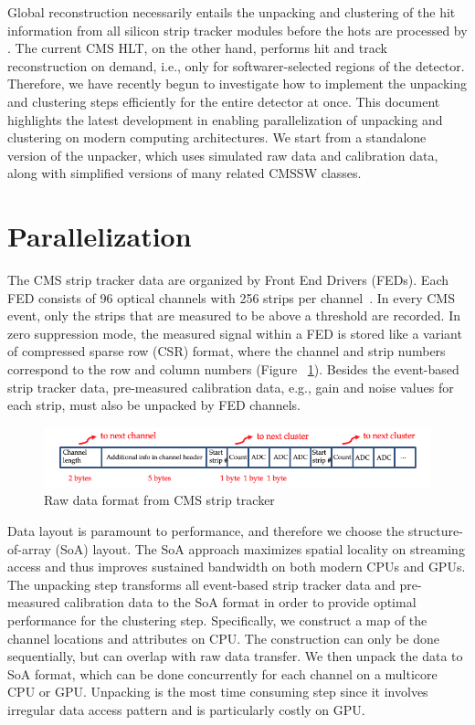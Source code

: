\documentclass[10pt, paper=a4, UKenglish]{article}
\begin{document}
Global reconstruction necessarily entails the unpacking and clustering of the hit information from all silicon strip tracker modules before the hots are processed by \mkFit. The current CMS HLT, on the other hand, performs hit and track reconstruction on demand, i.e., only for softwarer-selected regions of the detector. Therefore, we have recently begun to investigate how to implement the unpacking and clustering steps efficiently for the entire detector at once. This document highlights the latest development in enabling parallelization of unpacking and clustering on modern computing architectures. We start from a standalone version of the unpacker, which uses simulated raw data and calibration data, along with simplified versions of many related CMSSW classes. 

\section{Parallelization}
\label{para}
The CMS strip tracker data are organized by Front End Drivers (FEDs). Each FED consists of 96 optical channels with 256 strips per channel~\cite{Collaboration_2014}. In every CMS event, only the strips that are measured to be above a threshold are recorded. In zero suppression mode, the measured signal within a FED is stored like a variant of compressed sparse row (CSR) format, where the channel and strip numbers correspond to the row and column numbers (Figure ~\ref{fig:SSTlayout}). Besides the event-based strip tracker data, pre-measured calibration data, e.g., gain and noise values for each strip, must also be unpacked by FED channels. 

\begin{figure}[!htb]
  \centering
  \includegraphics[scale=0.5]{SSTlayout}
  \caption{Raw data format from CMS strip tracker}
  \label{fig:SSTlayout}
\end{figure}

Data layout is paramount to performance, and therefore we choose the structure-of-array (SoA) layout. The SoA approach maximizes spatial locality on streaming access and thus improves sustained bandwidth on both modern CPUs and GPUs. The unpacking step transforms all event-based strip tracker data and pre-measured calibration data to the SoA format in order to provide optimal performance for the clustering step. Specifically, we construct a map of the channel locations and attributes on CPU. The construction can only be done sequentially, but can overlap with raw data transfer. We then unpack the data to SoA format, which can be done concurrently for each channel on a multicore CPU or GPU. Unpacking is the most time consuming step since it involves irregular data access pattern and is particularly costly on GPU. 
\end{document}
